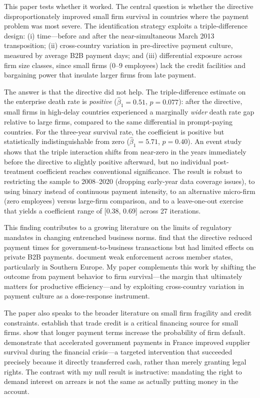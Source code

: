 \documentclass[12pt]{article}
\begin{document}
This paper tests whether it worked. The central question is whether the directive disproportionately improved small firm survival in countries where the payment problem was most severe. The identification strategy exploits a triple-difference design: (i) time---before and after the near-simultaneous March 2013 transposition; (ii) cross-country variation in pre-directive payment culture, measured by average B2B payment days; and (iii) differential exposure across firm size classes, since small firms (0--9 employees) lack the credit facilities and bargaining power that insulate larger firms from late payment.

The answer is that the directive did not help. The triple-difference estimate on the enterprise death rate is \emph{positive} ($\hat{\beta}_1 = 0.51$, $p = 0.077$): after the directive, small firms in high-delay countries experienced a marginally \emph{wider} death rate gap relative to large firms, compared to the same differential in prompt-paying countries. For the three-year survival rate, the coefficient is positive but statistically indistinguishable from zero ($\hat{\beta}_1 = 5.71$, $p = 0.40$). An event study shows that the triple interaction shifts from near-zero in the years immediately before the directive to slightly positive afterward, but no individual post-treatment coefficient reaches conventional significance. The result is robust to restricting the sample to 2008--2020 (dropping early-year data coverage issues), to using binary instead of continuous payment intensity, to an alternative micro-firm (zero employees) versus large-firm comparison, and to a leave-one-out exercise that yields a coefficient range of [0.38, 0.69] across 27 iterations.

This finding contributes to a growing literature on the limits of regulatory mandates in changing entrenched business norms. \citet{Ferrando2021} find that the directive reduced payment times for government-to-business transactions but had limited effects on private B2B payments. \citet{Connell2014} document weak enforcement across member states, particularly in Southern Europe. My paper complements this work by shifting the outcome from payment behavior to firm survival---the margin that ultimately matters for productive efficiency---and by exploiting cross-country variation in payment culture as a dose-response instrument.

The paper also speaks to the broader literature on small firm fragility and credit constraints. \citet{Petersen1997} establish that trade credit is a critical financing source for small firms. \citet{Klapper2006} show that longer payment terms increase the probability of firm default. \citet{Barrot2016} demonstrate that accelerated government payments in France improved supplier survival during the financial crisis---a targeted intervention that succeeded precisely because it directly transferred cash, rather than merely granting legal rights. The contrast with my null result is instructive: mandating the right to demand interest on arrears is not the same as actually putting money in the account.
\end{document}
